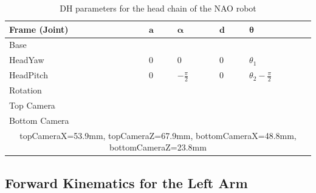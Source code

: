 \begin{table}[t!]
\centering
\caption{DH parameters for the head chain of the NAO robot}
\label{tab:DHhead}
\begin{tabular}{|l|>{\centering\arraybackslash}m{2.55cm}|>{\centering\arraybackslash}m{2.55cm}|>{\centering\arraybackslash}m{2.55cm}|>{\centering\arraybackslash}m{2.55cm}|}
\hline
\textbf{Frame (Joint)} & $\mathbf{a}$ & $\boldsymbol{\alpha}$ & $\mathbf{d}$ & $\boldsymbol{\theta}$\\ \hline
Base & \multicolumn{4}{c|}{$A(0,0,\text{\footnotesize{NeckOffsetZ}})$} \\ \hline
HeadYaw & $0$ & $0$ & $0$ & $\theta_1$ \\ \hline
HeadPitch & $0$ & $-\frac{\pi}{2}$ & $0$ & $\theta_2 - \frac{\pi}{2}$ \\ \hline
Rotation & \multicolumn{4}{c|}{$R_x(\frac{\pi}{2})R_y(\frac{\pi}{2})$} \\ \hline
Top Camera & \multicolumn{4}{c|}{$A(\text{\footnotesize{topCameraX}},0,\text{\footnotesize{topCameraZ}})$} \\ \hline
Bottom Camera & \multicolumn{4}{c|}{$A(\text{\footnotesize{bottomCameraX}},0,\text{\footnotesize{bottomCameraZ}})$} \\ \hline
\multicolumn{5}{|c|}{\footnotesize{topCameraX=53.9mm, topCameraZ=67.9mm, bottomCameraX=48.8mm, bottomCameraZ=23.8mm}} \\ \hline
\end{tabular}
\end{table}

\subsection{Forward Kinematics for the Left Arm}

